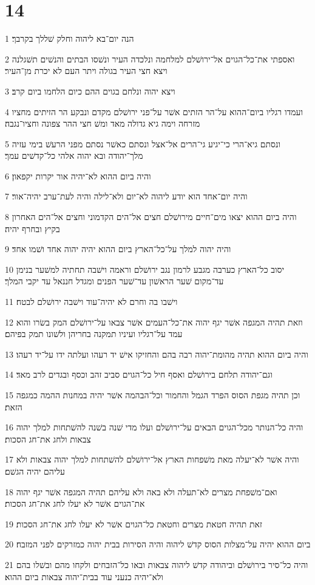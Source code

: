 \chapter{14}

\par 1 הנה יום־בא ליהוה וחלק שׁללך בקרבך׃
\par 2 ואספתי את־כל־הגוים אל־ירושׁלם למלחמה ונלכדה העיר ונשׁסו הבתים והנשׁים תשׁגלנה ויצא חצי העיר בגולה ויתר העם לא יכרת מן־העיר׃
\par 3 ויצא יהוה ונלחם בגוים ההם כיום הלחמו ביום קרב׃
\par 4 ועמדו רגליו ביום־ההוא על־הר הזתים אשׁר על־פני ירושׁלם מקדם ונבקע הר הזיתים מחציו מזרחה וימה גיא גדולה מאד ומשׁ חצי ההר צפונה וחציו־נגבה׃
\par 5 ונסתם גיא־הרי כי־יגיע גי־הרים אל־אצל ונסתם כאשׁר נסתם מפני הרעשׁ בימי עזיה מלך־יהודה ובא יהוה אלהי כל־קדשׁים עמך׃
\par 6 והיה ביום ההוא לא־יהיה אור יקרות יקפאון׃
\par 7 והיה יום־אחד הוא יודע ליהוה לא־יום ולא־לילה והיה לעת־ערב יהיה־אור׃
\par 8 והיה ביום ההוא יצאו מים־חיים מירושׁלם חצים אל־הים הקדמוני וחצים אל־הים האחרון בקיץ ובחרף יהיה׃
\par 9 והיה יהוה למלך על־כל־הארץ ביום ההוא יהיה יהוה אחד ושׁמו אחד׃
\par 10 יסוב כל־הארץ כערבה מגבע לרמון נגב ירושׁלם וראמה וישׁבה תחתיה למשׁער בנימן עד־מקום שׁער הראשׁון עד־שׁער הפנים ומגדל חננאל עד יקבי המלך׃
\par 11 וישׁבו בה וחרם לא יהיה־עוד וישׁבה ירושׁלם לבטח׃
\par 12 וזאת תהיה המגפה אשׁר יגף יהוה את־כל־העמים אשׁר צבאו על־ירושׁלם המק בשׂרו והוא עמד על־רגליו ועיניו תמקנה בחריהן ולשׁונו תמק בפיהם׃
\par 13 והיה ביום ההוא תהיה מהומת־יהוה רבה בהם והחזיקו אישׁ יד רעהו ועלתה ידו על־יד רעהו׃
\par 14 וגם־יהודה תלחם בירושׁלם ואסף חיל כל־הגוים סביב זהב וכסף ובגדים לרב מאד׃
\par 15 וכן תהיה מגפת הסוס הפרד הגמל והחמור וכל־הבהמה אשׁר יהיה במחנות ההמה כמגפה הזאת׃
\par 16 והיה כל־הנותר מכל־הגוים הבאים על־ירושׁלם ועלו מדי שׁנה בשׁנה להשׁתחות למלך יהוה צבאות ולחג את־חג הסכות׃
\par 17 והיה אשׁר לא־יעלה מאת משׁפחות הארץ אל־ירושׁלם להשׁתחות למלך יהוה צבאות ולא עליהם יהיה הגשׁם׃
\par 18 ואם־משׁפחת מצרים לא־תעלה ולא באה ולא עליהם תהיה המגפה אשׁר יגף יהוה את־הגוים אשׁר לא יעלו לחג את־חג הסכות׃
\par 19 זאת תהיה חטאת מצרים וחטאת כל־הגוים אשׁר לא יעלו לחג את־חג הסכות׃
\par 20 ביום ההוא יהיה על־מצלות הסוס קדשׁ ליהוה והיה הסירות בבית יהוה כמזרקים לפני המזבח׃
\par 21 והיה כל־סיר בירושׁלם וביהודה קדשׁ ליהוה צבאות ובאו כל־הזבחים ולקחו מהם ובשׁלו בהם ולא־יהיה כנעני עוד בבית־יהוה צבאות ביום ההוא׃


